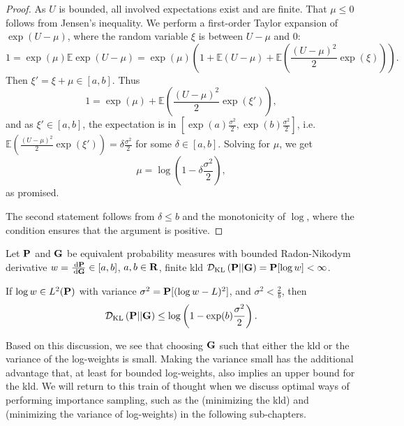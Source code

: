 \begin{proof}
    As $U$ is bounded, all involved expectations exist and are finite. That $\mu \leq 0$ follows from Jensen's inequality. We perform a first-order Taylor expansion of $\exp(U - \mu)$, where the random variable $\xi$ is between $U - \mu$ and $0$:
    $$
    1 = \exp(\mu)\mathbb E \exp (U - \mu) = \exp (\mu) \left( 1 + \mathbb E (U - \mu) + \mathbb E\left(\frac{(U-\mu)^{2}}{2} \exp(\xi)\right) \right).
    $$
    Then $\xi' = \xi + \mu \in [a,b]$. 
    Thus
    $$
    1 = \exp(\mu) + \mathbb E\left(\frac{(U-\mu)^{2}}{2} \exp(\xi')\right),
    $$
    and as $\xi' \in [a,b]$, the expectation is in $\left[\exp(a) \frac{\sigma^{2}}{2}, \exp(b) \frac{\sigma^{2}}{2}\right]$, i.e. $\mathbb E\left(\frac{(U-\mu)^{2}}{2} \exp(\xi')\right) = \delta \frac{\sigma^{2}}{2}$ for some $\delta \in [a,b]$. Solving for $\mu$, we get 
    $$
    \mu = \log \left( 1 - \delta \frac{\sigma^{2}}{2} \right),
    $$
    as promised.

    The second statement follows from $\delta \leq b$ and the monotonicity of $\log$, where the condition ensures that the argument is positive.
\end{proof}

\begin{corollary}
    Let $\P$ and $\G$ be equivalent probability measures with bounded Radon-Nikodym derivative $w = \frac{\d\P}{\d\G} \in [a,b]$, $a, b \in \R$, finite \acrshort{kld} $\Dkl{\P}{\G} =\P [\log w] < \infty$.
    
    If $\log w \in L^{2}(\P)$ with variance $\sigma^{2} = \P [(\log w - L)^2]$, and $\sigma^{2} < \frac{2}{b}$, then 
    $$
    \Dkl{\P}{\G} \leq \log \left(1 - \exp(b) \frac{\sigma^{2}}{2} \right).
    $$
\end{corollary}

Based on this discussion, we see that choosing $\G$ such that either the \acrshort{kld} or the variance of the log-weights is small. Making the variance small has the additional advantage that, at least for bounded log-weights, also implies an upper bound for the \acrshort{kld}. We will return to this train of thought when we discuss optimal ways of performing importance sampling, such as the \acem (minimizing the \acrshort{kld}) and \aeis (minimizing the variance of log-weights) in the following sub-chapters.

